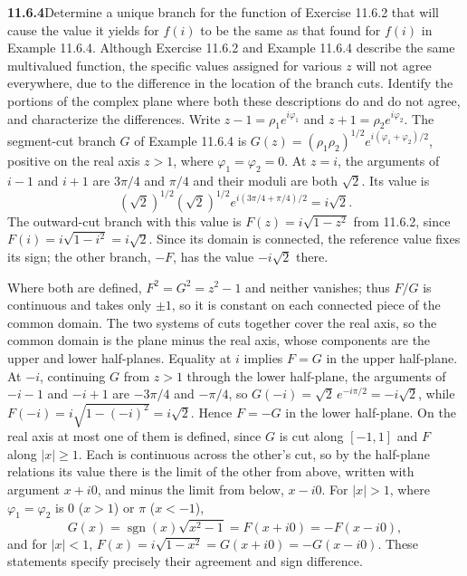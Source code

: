 \par\bigskip
\noindent\textbf{11.6.4}\quad Determine a unique branch for the function of
Exercise 11.6.2 that will cause the value it yields for $f(i)$ to be the same
as that found for $f(i)$ in Example 11.6.4. Although Exercise 11.6.2 and
Example 11.6.4 describe the same multivalued function, the specific values
assigned for various $z$ will not agree everywhere, due to the difference in
the location of the branch cuts. Identify the portions of the complex plane
where both these descriptions do and do not agree, and characterize the
differences.
\solution
Write $z-1=\rho_1e^{i\varphi_1}$ and $z+1=\rho_2e^{i\varphi_2}$. The
segment-cut branch $G$ of Example 11.6.4 is
$G(z)=(\rho_1\rho_2)^{1/2}e^{i(\varphi_1+\varphi_2)/2}$, positive on
the real axis $z>1$, where $\varphi_1=\varphi_2=0$.
At $z=i$, the arguments of $i-1$ and $i+1$ are $3\pi/4$ and
$\pi/4$ and their moduli are both $\sqrt2$. Its value is
\[
(\sqrt2)^{1/2}(\sqrt2)^{1/2}
e^{i(3\pi/4+\pi/4)/2}=\boxed{i\sqrt2}.
\]
The outward-cut branch with this value is
$F(z)=i\sqrt{1-z^2}$ from 11.6.2, since $F(i)=i\sqrt{1-i^2}=i\sqrt2$.
Since its domain is connected, the reference value fixes its sign;
the other branch, $-F$, has the value $-i\sqrt2$ there.

Where both are defined,
$F^2=G^2=z^2-1$ and neither vanishes; thus $F/G$ is continuous
and takes only $\pm1$, so it is constant on each connected piece of
the common domain. The two systems of cuts together cover the real
axis, so the common domain is the plane minus the real axis, whose
components are the upper and lower half-planes.
Equality at $i$ implies $F=G$ in the upper half-plane.
At $-i$, continuing $G$ from $z>1$ through the lower half-plane, the
arguments of $-i-1$ and $-i+1$ are $-3\pi/4$ and $-\pi/4$, so
$G(-i)=\sqrt2\,e^{-i\pi/2}=-i\sqrt2$, while
$F(-i)=i\sqrt{1-(-i)^2}=i\sqrt2$. Hence $F=-G$ in the lower half-plane.
On the real axis at most one of them is defined, since $G$ is cut along
$[-1,1]$ and $F$ along $|x|\ge1$. Each is continuous across the other's
cut, so by the half-plane relations its value there is the limit of the
other from above, written with argument $x+i0$, and minus the limit from
below, $x-i0$. For $|x|>1$, where $\varphi_1=\varphi_2$ is $0$ ($x>1$) or
$\pi$ ($x<-1$),
\[
G(x)=\operatorname{sgn}(x)\sqrt{x^2-1}=F(x+i0)=-F(x-i0),
\]
and for $|x|<1$, $F(x)=i\sqrt{1-x^2}=G(x+i0)=-G(x-i0)$.
These statements specify precisely their agreement and sign difference.

